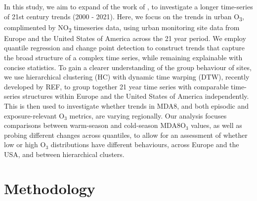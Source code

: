 \documentclass[journal abbreviation, manuscript]{copernicus}
\begin{document}

In this study, we aim to expand of the work of \cite{fleming_2018}, to investigate a longer time-series of 21st century trends (2000 - 2021). Here, we focus on the trends in urban O\textsubscript{3}, complimented by NO\textsubscript{2} timeseries data, using urban monitoring site data from Europe and the United States of America across the 21 year period. We employ quantile regression and change point detection to construct trends that capture the broad structure of a complex time series, while remaining explainable with concise statistics. To gain a clearer understanding of the group behaviour of sites, we use hierarchical clustering (HC) with dynamic time warping (DTW), recently developed by REF, to group together 21 year time series with comparable time-series structures within Europe and the United States of America independently. This is then used to investigate whether trends in MDA8, and both episodic and exposure-relevant O$_3$ metrics, are varying regionally. Our analysis focuses comparisons between warm-season and cold-season MDA8O$_3$ values, as well as probing different changes across quantiles, to allow for an assessment of whether low or high O$_3$ distributions have different behaviours, across Europe and the USA, and between hierarchical clusters.

\section{Methodology} \label{sect:method}
\end{document}
